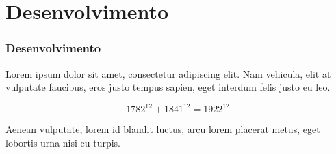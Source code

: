 \section{Desenvolvimento} %

\begin{frame}
	\frametitle{Desenvolvimento}
    Lorem ipsum dolor sit amet, consectetur adipiscing elit. Nam vehicula, elit at vulputate faucibus, eros justo tempus sapien, eget interdum felis justo eu leo. 

    \begin{equation*}
        1782^{12} + 1841^{12} = 1922^{12}
    \end{equation*}

    Aenean vulputate, lorem id blandit luctus, arcu lorem placerat metus, eget lobortis urna nisi eu turpis.
\end{frame}
